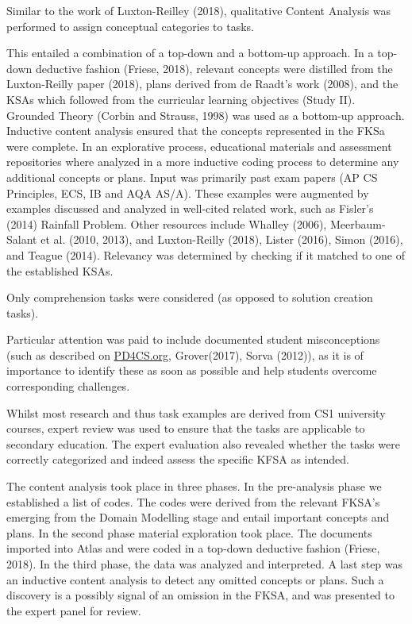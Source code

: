 Similar to the work of Luxton-Reilley (2018), qualitative Content Analysis was performed to assign conceptual categories to tasks.




This entailed a combination of a top-down and a bottom-up approach. In a top-down deductive fashion (Friese, 2018), relevant concepts were distilled from the Luxton-Reilly paper (2018), plans derived from de Raadt's work (2008), and the KSAs which followed from the curricular learning objectives (Study II). Grounded Theory (Corbin and Strauss, 1998) was used as a bottom-up approach. Inductive content analysis ensured that the concepts represented in the FKSa were complete. In an explorative process, educational materials and assessment repositories where analyzed in a more inductive coding process to determine any additional concepts or plans. Input was primarily past exam papers (AP CS Principles, ECS, IB and AQA AS/A). These examples were augmented by examples discussed and analyzed in well-cited related work, such as Fisler's (2014) Rainfall Problem. Other resources include Whalley (2006), Meerbaum-Salant et al. (2010, 2013), and Luxton-Reilly (2018), Lister (2016), Simon (2016), and Teague (2014). Relevancy was determined by checking if it matched to one of the established KSAs.%

Only comprehension tasks were considered (as opposed to solution creation tasks).

Particular attention was paid to include documented student misconceptions (such as described on \url{PD4CS.org}, Grover(2017), Sorva (2012)), as it is of importance to identify these as soon as possible and help students overcome corresponding challenges.

Whilst most research and thus task examples are derived from CS1 university courses, expert review was used to ensure that the tasks are applicable to secondary education. The expert evaluation also revealed whether the tasks were correctly categorized and indeed assess the specific KFSA as intended.


The content analysis took place in three phases. In the pre-analysis phase we established a list of codes. The codes were derived from the relevant FKSA's emerging from the Domain Modelling stage and entail important concepts and plans. In the second phase material exploration took place. The documents imported into Atlas and were coded in a top-down deductive fashion (Friese, 2018). In the third phase, the data was analyzed and interpreted. A last step was an inductive content analysis to detect any omitted concepts or plans. Such a discovery is a possibly signal of an omission in the FKSA, and was presented to the expert panel for review.


